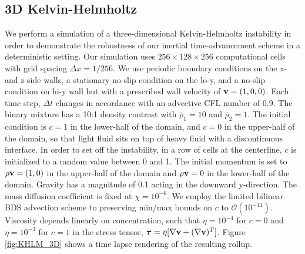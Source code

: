 \documentclass[final]{siamltex}
\def\vb {{\bf v}}
\def\taub   {\boldsymbol{\tau}}
\begin{document}
\subsection{3D Kelvin-Helmholtz}
We perform a simulation of a three-dimensional Kelvin-Helmholtz instability in order to demonstrate
the robustness of our inertial time-advancement scheme in a deterministic setting.
Our simulation uses $256\times 128\times 256$ computational cells with grid spacing
$\Delta x=1/256$.  We use periodic boundary conditions on the x- and z-side walls, a 
stationary no-slip condition on the lo-y, and a no-slip condition on hi-y wall
but with a prescribed wall velocity of $\vb=(1,0,0)$.
Each time step, $\Delta t$ changes in accordance with an
advective CFL number of 0.9.  The binary mixture has a 10:1 density contrast with
$\bar\rho_1=10$ and $\bar\rho_2=1$.  The initial condition is $c=1$ in the lower-half
of the domain, and $c=0$ in the upper-half of the domain, so that light fluid
sits on top of heavy fluid with a discontinuous interface.
In order to set off the instability, 
in a row of cells at the centerline, $c$ is initialized to a random value between 0 and 1.
The initial momentum is set to $\rho\vb=(1,0)$ in the upper-half of
the domain and $\rho\vb=0$ in the lower-half of the domain.
Gravity has a magnitude of 0.1 acting in the downward y-direction.
The mass diffusion coefficient is fixed at $\chi=10^{-6}$.
We employ the limited bilinear BDS advection scheme to
preserving min/max bounds on $c$ to $\mathcal O(10^{-11})$.
Viscosity depends linearly on concentration, such that $\eta=10^{-4}$ for $c=0$ 
and $\eta=10^{-3}$ for $c=1$ in the stress tensor,
$\taub = \eta[\nabla\vb + (\nabla\vb)^T]$.
Figure \ref{fig:KHLM_3D} shows a time lapse rendering of the resulting rollup.
\end{document}

